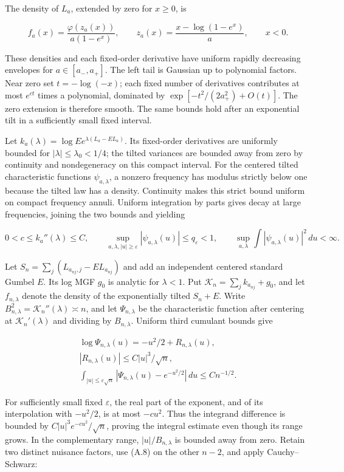 \documentclass{article}
\begin{document}
The density of \(L_a\), extended by zero for \(x\ge0\), is

\[
f_a(x)=\frac{\varphi(z_a(x))}{a(1-e^x)},\qquad
z_a(x)=\frac{x-\log(1-e^x)}a,\qquad x<0 .
\tag{A.7}
\]

These densities and each fixed-order derivative have uniform rapidly
decreasing envelopes for \(a\in[a_-,a_+]\). The left tail is Gaussian up
to polynomial factors. Near zero set \(t=-\log(-x)\); each fixed number
of derivatives contributes at most \(e^{ct}\) times a polynomial,
dominated by \(\exp[-t^2/(2a_+^2)+O(t)]\). The zero extension is
therefore smooth. The same bounds hold after an exponential tilt in a
sufficiently small fixed interval.

Let \(k_a(\lambda)=\log E e^{\lambda(L_a-EL_a)}\). Its fixed-order
derivatives are uniformly bounded for \(|\lambda|\le\lambda_0<1/4\); the
tilted variances are bounded away from zero by continuity and
nondegeneracy on this compact interval. For the centered tilted
characteristic functions \(\psi_{a,\lambda}\), a nonzero frequency has
modulus strictly below one because the tilted law has a density.
Continuity makes this strict bound uniform on compact frequency annuli.
Uniform integration by parts gives decay at large frequencies, joining
the two bounds and yielding

\[
0<c\le k_a''(\lambda)\le C,\qquad
\sup_{a,\lambda,|u|\ge\varepsilon}|\psi_{a,\lambda}(u)|\le q_\varepsilon<1,
\qquad
\sup_{a,\lambda}\int|\psi_{a,\lambda}(u)|^2\,du<\infty .
\tag{A.8}
\]

Let \(S_n=\sum_j(L_{a_{nj},j}-EL_{a_{nj}})\) and add an independent
centered standard Gumbel \(E\). Its log MGF \(g_0\) is analytic for
\(\lambda<1\). Put \(\mathcal K_n=\sum_jk_{a_{nj}}+g_0\), and let
\(f_{n,\lambda}\) denote the density of the exponentially tilted
\(S_n+E\). Write \(B_{n,\lambda}^2=\mathcal K_n''(\lambda)\asymp n\),
and let \(\Psi_{n,\lambda}\) be the characteristic function after
centering at \(\mathcal K_n'(\lambda)\) and dividing by
\(B_{n,\lambda}\). Uniform third cumulant bounds give

\[
\begin{gathered}
\log\Psi_{n,\lambda}(u)=-u^2/2+R_{n,\lambda}(u),\\
|R_{n,\lambda}(u)|\le C|u|^3/\sqrt n,\\
\int_{|u|\le\varepsilon\sqrt n}
|\Psi_{n,\lambda}(u)-e^{-u^2/2}|\,du\le Cn^{-1/2}.
\end{gathered}
\]

For sufficiently small fixed \(\varepsilon\), the real part of the
exponent, and of its interpolation with \(-u^2/2\), is at most
\(-cu^2\). Thus the integrand difference is bounded by
\(C|u|^3e^{-cu^2}/\sqrt n\), proving the integral estimate even though
its range grows. In the complementary range, \(|u|/B_{n,\lambda}\) is
bounded away from zero. Retain two distinct nuisance factors, use (A.8)
on the other \(n-2\), and apply Cauchy--Schwarz:
\end{document}

